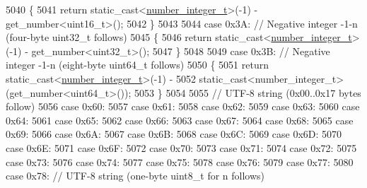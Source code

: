 \begin{DoxyCode}
5040             \{
5041                 \textcolor{keywordflow}{return} \textcolor{keyword}{static\_cast<}\hyperlink{classnlohmann_1_1detail_1_1binary__reader_ac6065302a10df2e78ed23a0e02e832bf}{number\_integer\_t}\textcolor{keyword}{>}(-1) - get\_number<uint16\_t>();
5042             \}
5043 
5044             \textcolor{keywordflow}{case} 0x3A: \textcolor{comment}{// Negative integer -1-n (four-byte uint32\_t follows)}
5045             \{
5046                 \textcolor{keywordflow}{return} \textcolor{keyword}{static\_cast<}\hyperlink{classnlohmann_1_1detail_1_1binary__reader_ac6065302a10df2e78ed23a0e02e832bf}{number\_integer\_t}\textcolor{keyword}{>}(-1) - get\_number<uint32\_t>();
5047             \}
5048 
5049             \textcolor{keywordflow}{case} 0x3B: \textcolor{comment}{// Negative integer -1-n (eight-byte uint64\_t follows)}
5050             \{
5051                 \textcolor{keywordflow}{return} \textcolor{keyword}{static\_cast<}\hyperlink{classnlohmann_1_1detail_1_1binary__reader_ac6065302a10df2e78ed23a0e02e832bf}{number\_integer\_t}\textcolor{keyword}{>}(-1) -
5052                        static\_cast<number\_integer\_t>(get\_number<uint64\_t>());
5053             \}
5054 
5055             \textcolor{comment}{// UTF-8 string (0x00..0x17 bytes follow)}
5056             \textcolor{keywordflow}{case} 0x60:
5057             \textcolor{keywordflow}{case} 0x61:
5058             \textcolor{keywordflow}{case} 0x62:
5059             \textcolor{keywordflow}{case} 0x63:
5060             \textcolor{keywordflow}{case} 0x64:
5061             \textcolor{keywordflow}{case} 0x65:
5062             \textcolor{keywordflow}{case} 0x66:
5063             \textcolor{keywordflow}{case} 0x67:
5064             \textcolor{keywordflow}{case} 0x68:
5065             \textcolor{keywordflow}{case} 0x69:
5066             \textcolor{keywordflow}{case} 0x6A:
5067             \textcolor{keywordflow}{case} 0x6B:
5068             \textcolor{keywordflow}{case} 0x6C:
5069             \textcolor{keywordflow}{case} 0x6D:
5070             \textcolor{keywordflow}{case} 0x6E:
5071             \textcolor{keywordflow}{case} 0x6F:
5072             \textcolor{keywordflow}{case} 0x70:
5073             \textcolor{keywordflow}{case} 0x71:
5074             \textcolor{keywordflow}{case} 0x72:
5075             \textcolor{keywordflow}{case} 0x73:
5076             \textcolor{keywordflow}{case} 0x74:
5077             \textcolor{keywordflow}{case} 0x75:
5078             \textcolor{keywordflow}{case} 0x76:
5079             \textcolor{keywordflow}{case} 0x77:
5080             \textcolor{keywordflow}{case} 0x78: \textcolor{comment}{// UTF-8 string (one-byte uint8\_t for n follows)}

\end{DoxyCode}
